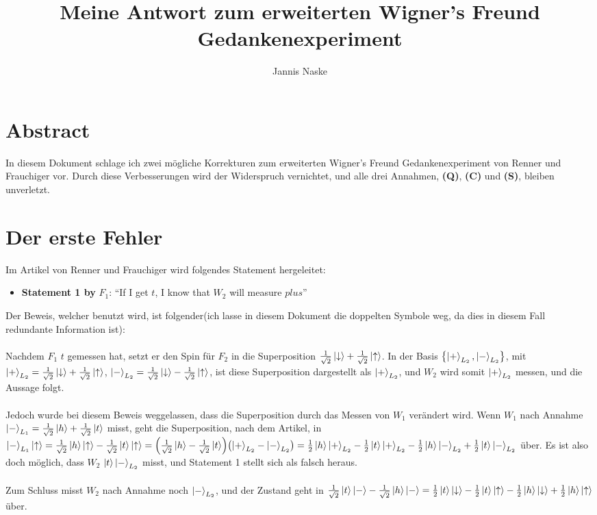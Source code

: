\documentclass[a4paper]{article}
\title{Meine Antwort zum erweiterten Wigner's Freund Gedankenexperiment}
\author{Jannis Naske}
\begin{document}
\maketitle

\section*{Abstract}
In diesem Dokument schlage ich zwei mögliche Korrekturen zum erweiterten Wigner's Freund Gedankenexperiment von Renner und Frauchiger vor.
Durch diese Verbesserungen wird der Widerspruch vernichtet, und alle drei Annahmen, \textbf{(Q)}, \textbf{(C)} und \textbf{(S)}, bleiben unverletzt.

\section*{Der erste Fehler}
Im Artikel von Renner und Frauchiger wird folgendes Statement hergeleitet:
\begin{itemize}
	\item \textbf{Statement 1 by} $F_1$: ``If I get $t$, I know that $W_2$ will measure $plus$''
\end{itemize}
Der Beweis, welcher benutzt wird, ist folgender(ich lasse in diesem Dokument die doppelten Symbole weg, da dies in diesem Fall redundante Information ist):\\\\
Nachdem $F_1$ $t$ gemessen hat, setzt er den Spin für $F_2$ in die Superposition $\frac{1}{\sqrt{2}} \ket{\downarrow} + \frac{1}{\sqrt{2}} \ket{\uparrow}$.
In der Basis $\qty{\ket{+}_{L_2}, \ket{-}_{L_2}}$, mit $\ket{+}_{L_2} = \frac{1}{\sqrt{2}} \ket{\downarrow} + \frac{1}{\sqrt{2}} \ket{\uparrow}$, $\ket{-}_{L_2} = \frac{1}{\sqrt{2}} \ket{\downarrow} - \frac{1}{\sqrt{2}} \ket{\uparrow}$,
ist diese Superposition dargestellt als $\ket{+}_{L_2}$, und $W_2$ wird somit $\ket{+}_{L_2}$ messen, und die Aussage folgt.\\\\
Jedoch wurde bei diesem Beweis weggelassen, dass die Superposition durch das Messen von $W_1$ verändert wird.
Wenn $W_1$ nach Annahme $\ket{-}_{L_1} = \frac{1}{\sqrt{2}}\ket{h} + \frac{1}{\sqrt{2}}\ket{t}$ misst, geht die Superposition, nach dem Artikel,
in $\ket{-}_{L_1}\ket{\uparrow} = \frac{1}{\sqrt{2}}\ket{h}\ket{\uparrow} - \frac{1}{\sqrt{2}}\ket{t}\ket{\uparrow} = \qty(\frac{1}{\sqrt{2}} \ket{h} - \frac{1}{\sqrt{2}} \ket{t})\qty(\ket{+}_{L_2} - \ket{-}_{L_2}) = \frac{1}{2}\ket{h}\ket{+}_{L_2} - \frac{1}{2}\ket{t}\ket{+}_{L_2} - \frac{1}{2}\ket{h}\ket{-}_{L_2} + \frac{1}{2}\ket{t}\ket{-}_{L_2}$ über. Es ist also doch möglich, dass $W_2$ $\ket{t}\ket{-}_{L_2}$ misst, und Statement 1 stellt sich als falsch heraus.\\\\
Zum Schluss misst $W_2$ nach Annahme noch $\ket{-}_{L_2}$, und der Zustand geht in $\frac{1}{\sqrt{2}}\ket{t}\ket{-} - \frac{1}{\sqrt{2}}\ket{h}\ket{-} = \frac{1}{2}\ket{t}\ket{\downarrow} - \frac{1}{2}\ket{t}\ket{\uparrow} - \frac{1}{2}\ket{h}\ket{\downarrow} + \frac{1}{2}\ket{h}\ket{\uparrow}$ über.
\end{document}
